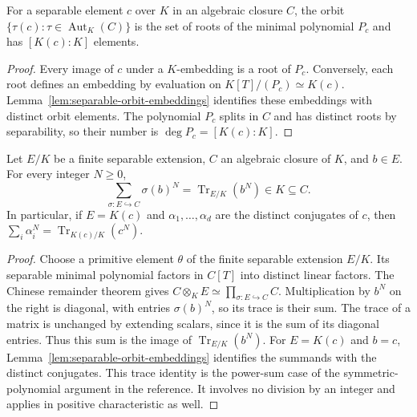 \begin{lemma}\label{lem:separable-orbit-cardinality}
\leanok
{}
For a separable element $c$ over $K$ in an algebraic closure $C$, the
orbit $\{\tau(c):\tau\in\operatorname{Aut}_K(C)\}$ is the set of roots
of the minimal polynomial $P_c$ and has $[K(c):K]$ elements.
\end{lemma}
\begin{proof}
Every image of $c$ under a $K$-embedding is a root of $P_c$.
Conversely, each root defines an embedding by evaluation on
$K[T]/(P_c)\simeq K(c)$. Lemma~\ref{lem:separable-orbit-embeddings}
identifies these embeddings with distinct orbit elements. The polynomial
$P_c$ splits in $C$ and has distinct roots by separability, so their
number is $\deg P_c=[K(c):K]$.
\end{proof}

\begin{lemma}\label{lem:orbit-power-sums}
\leanok
{}
Let $E/K$ be a finite separable extension, $C$ an algebraic closure
of $K$, and $b\in E$. For every integer $N\geq0$,
\[
 \sum_{\sigma:E\hookrightarrow C}\sigma(b)^N
 =\operatorname{Tr}_{E/K}(b^N)\in K\subseteq C.
\]
In particular, if $E=K(c)$ and $\alpha_1,\ldots,\alpha_d$ are the
distinct conjugates of $c$, then
$\sum_i\alpha_i^N=\operatorname{Tr}_{K(c)/K}(c^N)$.
\end{lemma}
\begin{proof}
Choose a primitive element $\theta$ of the finite separable extension
$E/K$. Its separable minimal polynomial factors in $C[T]$ into
distinct linear factors.
The Chinese remainder theorem gives
$C\otimes_K E\simeq\prod_{\sigma:E\hookrightarrow C}C$.
Multiplication by $b^N$ on the right is diagonal, with entries
$\sigma(b)^N$, so its trace is their sum. The trace of a matrix is
unchanged by extending scalars, since it is the sum of its diagonal
entries. Thus this sum is the image of $\operatorname{Tr}_{E/K}(b^N)$.
For $E=K(c)$ and $b=c$, Lemma~\ref{lem:separable-orbit-embeddings}
identifies the summands with the distinct conjugates. This trace identity
is the power-sum case of the symmetric-polynomial argument in the
reference. It involves no division by an integer and applies in
positive characteristic as well.
\end{proof}

